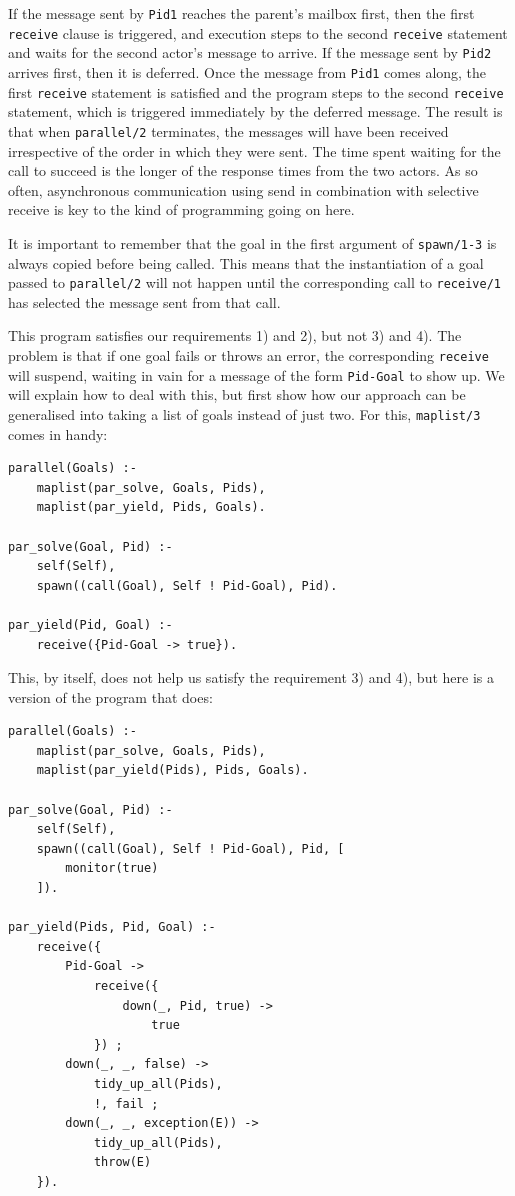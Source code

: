 If the message sent by \texttt{Pid1} reaches the parent's mailbox first, then the first \texttt{receive} clause is triggered, and execution steps to the second \texttt{receive} statement and waits for the second actor's message to arrive. If the message sent by \texttt{Pid2} arrives first, then it is deferred. Once the message from \texttt{Pid1} comes along, the first \texttt{receive} statement is satisfied and the program steps to the second \texttt{receive} statement, which is triggered immediately by the deferred message. The result is that when \texttt{parallel/2} terminates, the messages will have been received irrespective of the order in which they were sent. The time spent waiting for the call to succeed is the longer of the response times from the two actors. As so often, asynchronous communication using send in combination with selective receive is key to the kind of programming going on here.

It is important to remember that the goal in the first argument of \texttt{spawn/1-3} is always copied before being called. This means that the instantiation of a goal passed to \texttt{parallel/2} will not happen until the corresponding call to \texttt{receive/1} has selected the message sent from that call.

This program satisfies our requirements 1) and 2), but not 3) and 4). The problem is that if one goal fails or throws an error, the corresponding \texttt{receive} will suspend, waiting in vain for a message of the form \texttt{Pid-Goal} to show up. We will explain how to deal with this, but first show how our approach can be generalised into taking a list of goals instead of just two. For this, \texttt{maplist/3} comes in handy: 

\begin{verbatim}
parallel(Goals) :-
    maplist(par_solve, Goals, Pids),
    maplist(par_yield, Pids, Goals).

par_solve(Goal, Pid) :- 
    self(Self),
    spawn((call(Goal), Self ! Pid-Goal), Pid).

par_yield(Pid, Goal) :-        
    receive({Pid-Goal -> true}). 
\end{verbatim}

\noindent This, by itself, does not help us satisfy the requirement 3) and 4), but here is a version of the program that does:

\begin{verbatim}    
parallel(Goals) :-
    maplist(par_solve, Goals, Pids),
    maplist(par_yield(Pids), Pids, Goals).

par_solve(Goal, Pid) :-
    self(Self),
    spawn((call(Goal), Self ! Pid-Goal), Pid, [
        monitor(true)
    ]).

par_yield(Pids, Pid, Goal) :-
    receive({
        Pid-Goal ->
            receive({
                down(_, Pid, true) ->
                    true
            }) ;
        down(_, _, false) ->
            tidy_up_all(Pids),
            !, fail ;
        down(_, _, exception(E)) ->
            tidy_up_all(Pids),
            throw(E)
    }).
\end{verbatim}

